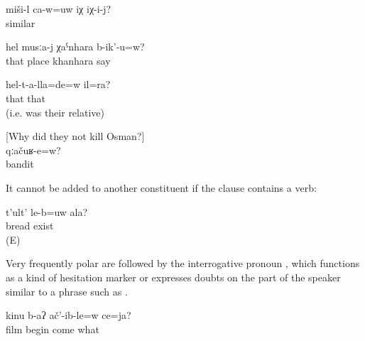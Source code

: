\begin{exe}
	\ex	\label{ex:Is this similar to him}
	\gll	miši-l	ca-w=uw	iχ	iχ-i-j?\\
		similar			\\
	\glt	{}

	\ex	\label{ex:Is this place called khanhara? Yes}
	\gll	hel	musːa-j	χaˁnhara	b-ik'-u=w?	\\
		that	place	khanhara	say	\\
	\glt	{}

	\ex	\label{ex:‎He also belonged to them? (i.e. was their relative)}
	\gll	hel-t-a-lla=de=w	il=ra?	\\
		that	that\\
	\glt	{} (i.e. was their relative)

	\ex	\label{ex:‎The bandits?}[Why did they not kill Osman?]\\
		\gll	qːačuʁ-e=w?	\\
			bandit	\\
		\glt	{}

\end{exe}

It cannot be added to another constituent if the clause contains a verb:

\begin{exe}
	\ex	\label{ex:Do you have bread}
	\begin{xlist}
		\ex	\label{ex:Do you have bread@A}
		\gll	t'ult'	le-b=uw	ala?\\
			bread	exist	\\
		\glt	{} (E)
	
		\ex	{} \label{ex:Do you have bread@B}
	\end{xlist}
\end{exe}

Very frequently polar  are followed by the interrogative pronoun  , which functions as a kind of hesitation marker or expresses doubts on the part of the speaker similar to a phrase such as .

\begin{exe}
	\ex	\label{ex:‎‎‎Did the movie start or what}
	\gll	kinu	b-aʔ	ač'-ib-le=w	ce=ja?	\\
		film	begin	come	what\\
	\glt	{}
\end{exe}


